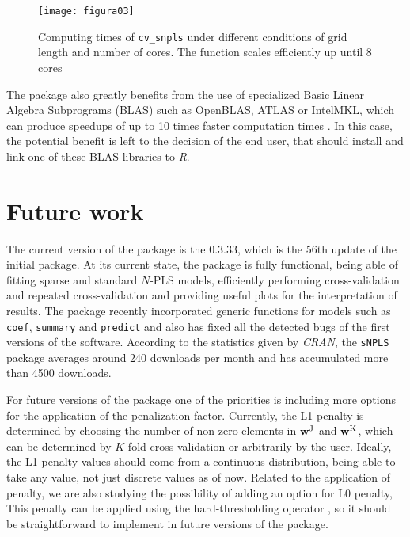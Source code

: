 \begin{figure}[hbtp]
	\centering
\texttt{[image: figura03]}
\caption{Computing times of \texttt{cv\_snpls} under different conditions of grid length and number of cores. The function scales efficiently up until 8 cores}
\label{figura03}
\end{figure}

The package also greatly benefits from the use of specialized Basic Linear Algebra Subprograms (BLAS) such as OpenBLAS, ATLAS or Intel\textregistered  MKL, which can produce speedups of up to 10 times faster computation times \parencite{xianyi2014openblas, wang2014intel}. In this case, the potential benefit is left to the decision of the end user, that should install and link one of these BLAS libraries to \textit{R}.

\section{Future work}
The current version of the package is the 0.3.33, which is the 56th update of the initial package. At its current state, the package is fully functional, being able of fitting sparse and standard $N$-PLS models, efficiently performing cross-validation and repeated cross-validation and providing useful plots for the interpretation of results. The package recently incorporated generic functions for models such as \texttt{coef}, \texttt{summary} and \texttt{predict} and also has fixed all the detected bugs of the first versions of the software. According to the statistics given by \textit{CRAN}, the \texttt{sNPLS} package averages around 240 downloads per month and has accumulated more than 4500 downloads.

For future versions of the package one of the priorities is including more options for the application of the penalization factor. Currently, the L1-penalty is determined by choosing the number of non-zero elements in $\textbf{\text{w}}^\text{J}$ and $\textbf{\text{w}}^\text{K}$, which can be determined by $K$-fold cross-validation or arbitrarily by the user. Ideally, the L1-penalty values should come from a continuous distribution, being able to take any value, not just discrete values as of now. Related to the application of penalty, we are also studying the possibility of adding an option for L0 penalty, This penalty can be applied using the hard-thresholding operator \parencite{zou2006adaptive}, so it should be straightforward to implement in future versions of the package.

